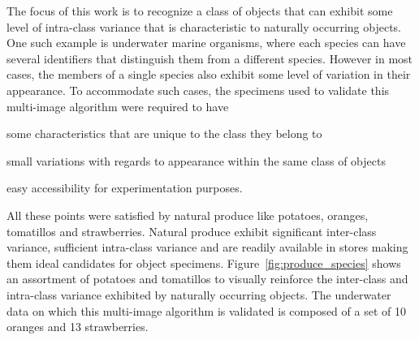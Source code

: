 \documentclass {udthesis}
\begin{document}
The focus of this work is to recognize a class of objects that can exhibit some level of intra-class variance that is characteristic to naturally occurring objects. One such example is underwater marine organisms, where each species can have several identifiers that distinguish them from a different species. However in most cases, the members of a single species also exhibit some level of variation in their appearance. To accommodate such cases, the specimens used to validate this multi-image algorithm were required to have \begin{enumerate*}[label=(a)]  \item some characteristics that are unique to the class they belong to \item small variations with regards to appearance within the same class of objects \item easy accessibility for experimentation purposes. \end{enumerate*} All these points were satisfied by natural produce like potatoes, oranges, tomatillos and strawberries. Natural produce exhibit significant inter-class variance, sufficient intra-class variance and are readily available in stores making 
them ideal 
candidates for object specimens. Figure~\ref{fig:produce_species} shows an assortment of potatoes and tomatillos to visually reinforce the inter-class and intra-class variance exhibited by naturally occurring objects. The underwater data on which this multi-image algorithm is validated is composed of a set of 10 oranges and 13 strawberries.
%
\end{document}
